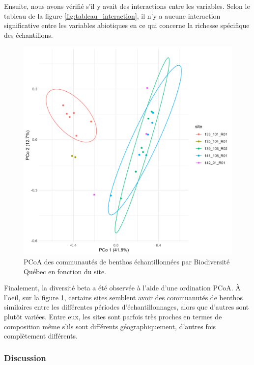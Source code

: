 \documentclass[9pt,twocolumn,twoside,]{pnas-new}
\begin{document}
Ensuite, nous avons vérifié s'il y avait des interactions entre les
variables. Selon le tableau de la figure \ref{fig:tableau_interaction},
il n'y a aucune interaction significative entre les variables abiotiques
en ce qui concerne la richesse spécifique des échantillons.

\begin{figure}
\centering
\includegraphics{ordination_sites.png}
\caption{PCoA des communautés de benthos échantillonnées par
Biodiversité Québec en fonction du site. \label{fig:ordination_sites}}
\end{figure}

Finalement, la diversité beta a été observée à l'aide d'une ordination
PCoA. À l'oeil, sur la figure \ref{fig:ordination_sites}, certains sites
semblent avoir des commuanutés de benthos similaires entre les
différentes périodes d'échantillonnages, alors que d'autres sont plutôt
variées. Entre eux, les sites sont parfois très proches en termes de
composition même s'ils sont différents géographiquement, d'autres fois
complètement différents.

\hypertarget{discussion}{%
\subsubsection*{Discussion}\label{discussion}}
\end{document}
